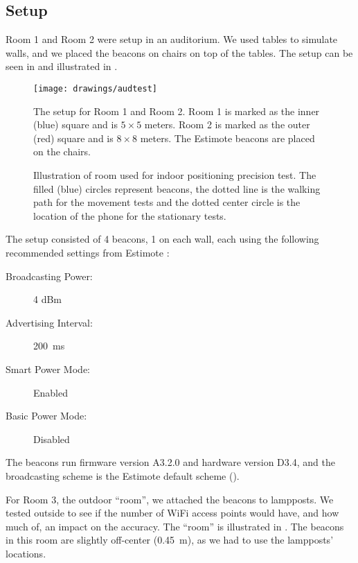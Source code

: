 \subsection{Setup}\label{sec:setup}
Room 1 and Room 2 were setup in an auditorium. 
We used tables to simulate walls, 
and we placed the beacons on chairs on top of the tables. 
The setup can be seen in  and illustrated in . 
\begin{figure}[!htb]
  \centering
  \texttt{[image: drawings/audtest]}
  \caption{The setup for Room 1 and Room 2. Room 1 is marked as the inner (blue) square and is $5 \times 5$ meters. Room 2 is marked as the outer (red) square and is $8 \times 8$ meters. The Estimote beacons are placed on the chairs.}
  \label{fig:audtest}
\end{figure}

\begin{figure}[!htb]
  \centering
  
  \caption{Illustration of room used for indoor positioning precision test. The filled (blue) circles represent beacons, the dotted line is the walking path for the movement tests and the dotted center circle is the location of the phone for the stationary tests.}
  \label{fig:precisiontest:illustration}
\end{figure}

The setup consisted of \num{4} beacons, \num{1} on each wall, 
each using the following recommended settings from Estimote \cite{estimote:settings}:
\begin{description}
  \item[Broadcasting Power:]{\num{4} dBm}
  \item[Advertising Interval:]{\SI{200}{\milli\second}}
  \item[Smart Power Mode:]{Enabled}
  \item[Basic Power Mode:]{Disabled}
\end{description}
The beacons run firmware version A3.2.0 and hardware version D3.4,
and the broadcasting scheme is the Estimote default scheme (\ie).

For Room 3, the outdoor ``room'',
we attached the beacons to lampposts. 
We tested outside to see if the number of WiFi access points would have, and how much of, 
an impact on the accuracy. 
The ``room'' is illustrated in . 
The beacons in this room are slightly off-center (\SI{0.45}{\meter}), 
as we had to use the lampposts' locations. 

